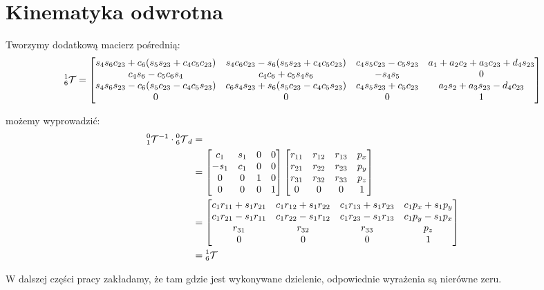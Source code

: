 \documentclass[]{article}
\newcommand\T{\mathcal{T}}
\begin{document}
\section{Kinematyka odwrotna}
Tworzymy dodatkową macierz pośrednią:
\scriptsize
\begin{equation}\prescript{1}{6}{\T} = \begin{bmatrix}
s_4s_6c_{23} + c_6(s_5s_{23} + c_4c_5c_{23}) &
s_4c_6c_{23} - s_6(s_5s_{23} + c_4c_5c_{23}) &
c_4s_5c_{23} - c_5s_{23} &
a_1 + a_2c_2 + a_3c_{23} + d_4s_{23}
\\
c_4s_6 - c_5c_6s_4 &
c_4c_6 + c_5s_4s_6 &
- s_4s_5 &
0
\\
s_4s_6s_{23} - c_6(s_5c_{23} - c_4c_5s_{23}) &
c_6s_4s_{23} + s_6(s_5c_{23} - c_4c_5s_{23}) &
c_4s_5s_{23} + c_5c_{23} &
a_2s_2 + a_3s_{23} - d_4c_{23}
\\
0 & 0 & 0 & 1
\end{bmatrix}
\end{equation}
\normalsize

możemy wyprowadzić:
\begin{align*}
\prescript{0}{1}{\T}^{-1} \cdot \prescript{0}{6}{\T}_d &= \\
&= \begin{bmatrix}
c_1 & s_1 & 0 & 0 \\
-s_1 & c_1 & 0 & 0 \\
0 & 0 & 1 & 0 \\
0 & 0 & 0 & 1
\end{bmatrix}\begin{bmatrix}
r_{11} & r_{12} & r_{13} & p_x \\
r_{21} & r_{22} & r_{23} & p_y \\
r_{31} & r_{32} & r_{33} & p_z \\
0 & 0 & 0 & 1
\end{bmatrix} \\
&= \begin{bmatrix}
c_1r_{11} + s_1r_{21} & c_1r_{12} + s_1r_{22} & c_1r_{13} + s_1r_{23} & c_1p_x + s_1p_y \\
c_1r_{21} - s_1r_{11} & c_1r_{22} - s_1r_{12} & c_1r_{23} - s_1r_{13} & c_1p_y - s_1p_x \\
r_{31} & r_{32} & r_{33} & p_z \\
0 & 0 & 0 & 1
\end{bmatrix} \\
&= \prescript{1}{6}{\T}
\end{align*}


W dalszej części pracy zakładamy, że tam gdzie jest wykonywane dzielenie, odpowiednie wyrażenia są nierówne zeru.
\end{document}

